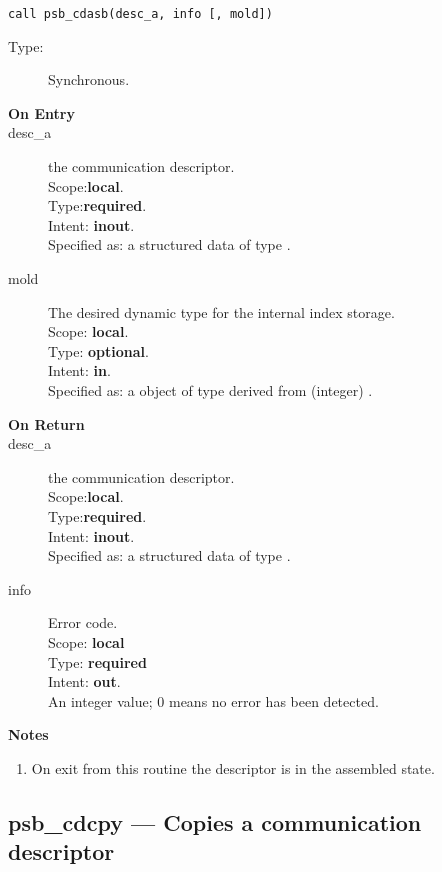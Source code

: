 \begin{verbatim}
call psb_cdasb(desc_a, info [, mold])
\end{verbatim}

\begin{description}
\item[Type:] Synchronous.
\item[\bf On Entry]
\item[desc\_a] the communication descriptor.\\
Scope:{\bf local}.\\
Type:{\bf required}.\\
Intent: {\bf inout}.\\
Specified as: a structured data of type \descdata.
\item[mold] The desired dynamic type for the internal index storage.\\
Scope: {\bf local}.\\
Type: {\bf optional}.\\
Intent: {\bf in}.\\
Specified as: a object of type derived from (integer) \vbasedata.
\end{description}

\begin{description}
\item[\bf On Return]
\item[desc\_a] the communication descriptor.\\
Scope:{\bf local}.\\
Type:{\bf required}.\\
Intent: {\bf inout}.\\
Specified as: a structured data of type \descdata.
\item[info] Error code.\\
Scope: {\bf local} \\
Type: {\bf required} \\
Intent: {\bf out}.\\
An integer value; 0 means no error has been detected. 
\end{description}
{\par\noindent\large\bfseries Notes}
\begin{enumerate}
\item On exit from this routine the descriptor is in the assembled
  state. 
\end{enumerate}



%
%
\clearpage\subsection*{psb\_cdcpy --- Copies a communication descriptor}

